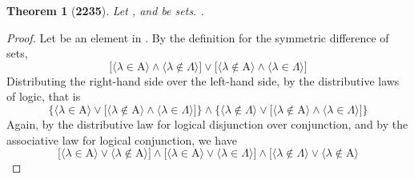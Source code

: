 \documentclass[preview]{standalone}
\newtheorem{theorem}{Theorem}
\begin{document}
\begin{theorem}[\textbf{2235}]
    Let , and \bm{$\Lambda$} be sets. 
    .
\end{theorem}
\begin{proof}
    Let \bm{$\lambda$} be an element in . 
    By the definition for the symmetric difference of sets,
    \begin{equation*}
        \bigg[
            \Big \langle \lambda \in \mathrm{A} \Big \rangle 
                \land 
            \Big \langle \lambda \notin \Lambda \Big \rangle
        \bigg] 
            \lor 
        \bigg[
            \Big \langle \lambda \notin \mathrm{A} \Big \rangle
                \land 
            \Big \langle \lambda \in \Lambda \Big \rangle
        \bigg]
    \end{equation*}
    Distributing the right-hand side over the left-hand side,
    by the distributive laws of logic, that is
    \begin{equation*}
        \Bigg\{
            \Big \langle \lambda \in \mathrm{A} \Big \rangle
                \lor
            \bigg[
                \Big \langle \lambda \notin \mathrm{A} \Big \rangle
                    \land 
                \Big \langle \lambda \in \Lambda \Big \rangle
            \bigg]
        \Bigg\}
            \land
        \Bigg\{
            \Big \langle \lambda \notin \Lambda \Big \rangle
                \lor
            \bigg[
                \Big \langle \lambda \notin \mathrm{A} \Big \rangle
                    \land 
                \Big \langle \lambda \in \Lambda \Big \rangle
            \bigg]
        \Bigg\}
    \end{equation*}
    Again, by the distributive law for logical disjunction over conjunction,
    and by the associative law for logical conjunction, we have
    \begin{equation*}
        \bigg[
            \Big \langle \lambda \in \mathrm{A} \Big \rangle
                \lor
            \Big \langle \lambda \notin \mathrm{A} \Big \rangle
        \bigg]
            \land
        \bigg[
            \Big \langle \lambda \in \mathrm{A} \Big \rangle
                \lor 
            \Big \langle \lambda \in \Lambda \Big \rangle
        \bigg]
            \land
        \bigg[
            \Big \langle \lambda \notin \Lambda \Big \rangle
                \lor
            \Big \langle \lambda \notin \mathrm{A} \Big \rangle

\end{equation*}
\end{proof}
\end{document}
